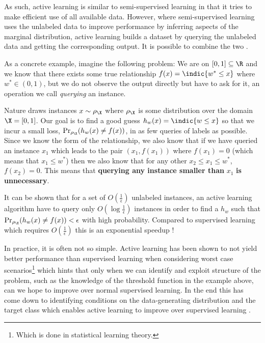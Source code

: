 As such, active learning is similar to semi-supervised learning
\citep{chapelle09_semi_super_learn_o} in that it tries to make efficient use of all
available data. However, where semi-supervised learning uses the unlabeled data
to improve performance by inferring aspects of the marginal distribution, active
learning builds a dataset by querying the unlabeled data and getting the
corresponding output. It is possible to combine the two \citep{zhu03_combin}.

As a concrete example, imagine the following problem: We are on \([0,
1] \subseteq \R\) and we know that there exists some true relationship
\(f(x) = \indic{w^{\ast} \leq x}\) where \(w^{\ast} \in (0, 1)\),
but we do not observe the output directly but have to ask for it, an operation we
call \emph{querying} an instance. 

Nature draws instances \(x \sim \rho_{\X}\) where \(\rho_{\X}\) is some
distribution over the domain \(\X = [0, 1]\). Our goal is to find a good guess
\(h_{w}(x) = \indic{w \leq x}\) so that we incur a small loss,
\(\Pr_{\rho_{\X}}(h_{w}(x) \neq f(x))\), in as few queries of labels as
possible. Since we know the form of the relationship, we also know that if we
have queried an instance \(x_{1}\) which leads to the pair \((x_{1}, f(x_{1}))\)
where \(f(x_{1}) = 0\) (which means that \(x_{1} \leq w^{\ast}\)) then we also
know that for any other \(x_{2} \leq x_{1} \leq w^{\ast}\), \(f(x_{2}) = 0\).
This means that \textbf{querying any instance smaller than} \(x_{1}\) \textbf{is unnecessary}.

It can be shown that for a set of \(O(\frac{1}{\epsilon})\) unlabeled
instances, an active learning algorithm have to query only \(O(\log
\frac{1}{\epsilon})\) instances in order to find a \(h_{w}\) such that \(\Pr_{\rho_{\X}}(h_{w}(x)
\neq f(x)) < \epsilon\) with high probability. Compared to supervised
learning which requires \(O(\frac{1}{\epsilon})\) this is an exponential
speedup \citep{dasgupta06_coars,dasgupta05_analy}!

In practice, it is often not so simple. Active learning has been shown to not
yield better performance than supervised learning when considering worst case
scenarios\footnote{Which is done in statistical learning theory.} which hints
that only when we can identify and exploit structure of the problem, such as the
knowledge of the threshold function in the example above, can we hope to improve
over normal supervised learning. In the end this has come down to identifying
conditions on the data-generating distribution and the target class which
enables active learning to improve over supervised learning
\citep{balkan15_activ_learn_moder_learn_theor}.

